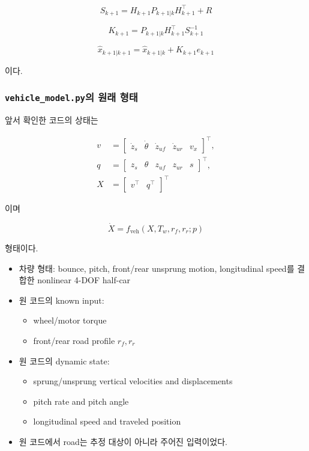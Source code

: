 \documentclass[letterpaper,10pt,journal,twocolumn]{ieeeconf}
\begin{document}
\[
S_{k+1}
=
H_{k+1}P_{k+1|k}H_{k+1}^\top+R
\]

\[
K_{k+1}
=
P_{k+1|k}H_{k+1}^\top S_{k+1}^{-1}
\]

\[
\hat x_{k+1|k+1}
=
\hat x_{k+1|k}+K_{k+1}e_{k+1}
\]

이다.

\subsubsection{\texttt{vehicle\_model.py}의 원래 형태}

앞서 확인한 코드의 상태는

\[
\begin{aligned}
v&=
\begin{bmatrix}
\dot z_s&\dot\theta&\dot z_{uf}&\dot z_{ur}&v_x
\end{bmatrix}^{\top},\\
q&=
\begin{bmatrix}
z_s&\theta&z_{uf}&z_{ur}&s
\end{bmatrix}^{\top},\\
X&=
\begin{bmatrix}
v^\top&q^\top
\end{bmatrix}^{\top}
\end{aligned}
\]

이며

\[
\dot X
=
f_{\mathrm{veh}}
\left(
X,T_w,r_f,r_r;p
\right)
\]

형태이다.

\begin{itemize}

\item
  차량 형태: bounce, pitch, front/rear unsprung motion, longitudinal speed를 결합한 nonlinear 4-DOF half-car
\item
  원 코드의 known input:

  \begin{itemize}
  
  \item
    wheel/motor torque
  \item
    front/rear road profile \(r_f,r_r\)
  \end{itemize}
\item
  원 코드의 dynamic state:

  \begin{itemize}
  
  \item
    sprung/unsprung vertical velocities and displacements
  \item
    pitch rate and pitch angle
  \item
    longitudinal speed and traveled position
  \end{itemize}
\item
  원 코드에서 road는 추정 대상이 아니라 주어진 입력이었다.
\end{itemize}
\end{document}
